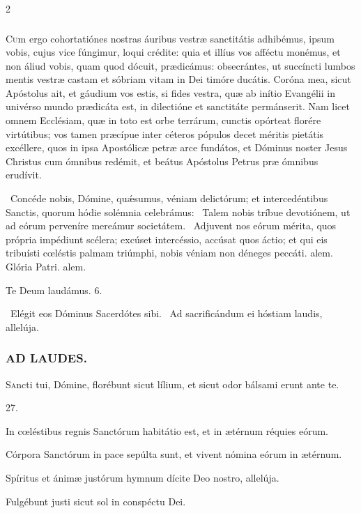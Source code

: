\documentclass[9pt,twoside]{extarticle}
\begin{document}
\begin{multicols}{2}
\subsubsection*{\center {}}
\lettrine{C}um ergo cohortatiónes nostras áuribus vestræ sanctitátis adhibémus, ipsum vobis, cujus vice fúngimur, loqui crédite: quia et illíus vos afféctu monémus, et non áliud vobis, quam quod dócuit, prædicámus: obsecrántes, ut succíncti lumbos mentis vestræ castam et sóbriam vitam in Dei timóre ducátis. Coróna mea, sicut Apóstolus ait, et gáudium vos estis, si fides vestra, quæ ab inítio Evangélii in univérso mundo prædicáta est, in dilectióne et sanctitáte permánserit. Nam licet omnem Ecclésiam, quæ in toto est orbe terrárum, cunctis opórteat florére virtútibus; vos tamen præcípue inter céteros pópulos decet méritis pietátis excéllere, quos in ipsa Apostólicæ petræ arce fundátos, et Dóminus noster Jesus Christus cum ómnibus redémit, et beátus Apóstolus Petrus præ ómnibus erudívit.

\begin{tightlist}{}
\item {}~Concéde nobis, Dómine, quǽsumus, véniam delictórum; et intercedéntibus Sanctis, quorum hódie solémnia celebrámus: \textred{*}~Talem nobis tríbue devotiónem, ut ad eórum perveníre mereámur societátem. ~Adjuvent nos eórum mérita, quos própria impédiunt scélera; excúset intercéssio, accúsat quos áctio; et qui eis tribuísti cœléstis palmam triúmphi, nobis véniam non déneges peccáti. alem. Glória Patri. alem.
\item Te Deum laudámus. 6.
\item {}~Elégit eos Dóminus Sacerdótes sibi. ~Ad sacrificándum ei hóstiam laudis, allelúja.
\end{tightlist}

\subsubsection*{\center \textsc{AD LAUDES.}}
\begin{center}\end{center}

\lettrine{S}ancti tui, Dómine, florébunt sicut lílium, et sicut odor bálsami erunt ante te.

\begin{tightlist}{}
\item {} 27.
\item {} In cœléstibus regnis Sanctórum habitátio est, et in ætérnum réquies eórum.
\item {} Córpora Sanctórum in pace sepúlta sunt, et vivent nómina eórum in ætérnum.
\item {} Spíritus et ánimæ justórum hymnum dícite Deo nostro, allelúja.
\item {} Fulgébunt justi sicut sol in conspéctu Dei.
\end{tightlist}


\end{multicols}
\end{document}

